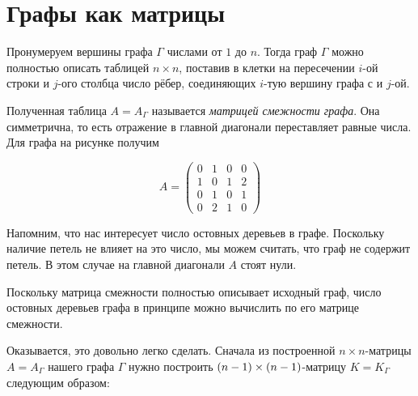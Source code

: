 \documentclass{article}
\begin{document}
\pagebreak[4]

\section{Графы как матрицы}


{

\begin{wrapfigure}{r}{32 mm}
\end{wrapfigure}

Пронумеруем вершины графа $\Gamma$ числами от $1$ до $n$.
Тогда граф $\Gamma$ можно полностью описать таблицей $n\times n$, поставив в клетки на пересечении $i$-ой строки и $j$-ого столбца число рёбер, соединяющих $i$-тую вершину графа с и $j$-ой.

}

Полученная таблица $A=A_\Gamma$ называется \emph{матрицей смежности графа}.
Она симметрична, то есть отражение в главной диагонали переставляет равные числа.
Для графа на рисунке получим 

\[A=\left(
\begin{matrix}
0&1&0&0
\\
1&0&1&2
\\
0&1&0&1
\\
0&2&1&0
\end{matrix}
\right)\]

Напомним, что нас интересует число остовных деревьев в графе.
Поскольку наличие петель не влияет на это число, мы можем считать, что граф не содержит петель.
В этом случае на главной диагонали $A$ стоят нули.

Поскольку матрица смежности полностью описывает исходный граф, 
число остовных деревьев графа в принципе можно вычислить по его матрице смежности.

Оказывается, это довольно легко сделать.
Сначала из построенной $n\times n$-матрицы  $A=A_\Gamma$ нашего графа $\Gamma$ нужно построить $(n-1)\z\times(n-1)$-матрицу $K=K_\Gamma$ следующим образом: 
\end{document}
